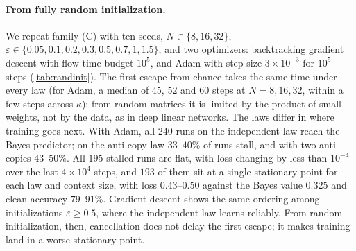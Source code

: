 \paragraph{From fully random initialization.}
We repeat family (C) with ten seeds, $N\in\{8,16,32\}$, $\varepsilon\in\{0.05,0.1,0.2,0.3,0.5,0.7,1,1.5\}$, and two optimizers: backtracking gradient descent with
flow-time budget $10^5$, and Adam with step size $3\times10^{-3}$ for $10^5$ steps (\cref{tab:randinit}).
The first escape from chance takes the same time under every law (for Adam, a median of $45$, $52$ and $60$ steps at $N=8,16,32$, within a few steps across $\kappa$):
from random matrices it is limited by the product of small weights, not by the data, as in deep linear networks.
The laws differ in where training goes next. With Adam, all $240$ runs on the independent law reach the Bayes predictor; on the anti-copy law $33$--$40\%$ of runs
stall, and with two anti-copies $43$--$50\%$. All $195$ stalled runs are flat, with loss changing by less than $10^{-4}$ over the last $4\times10^4$ steps, and $193$ of them sit at a single stationary point
for each law and context size, with loss $0.43$--$0.50$ against the Bayes value $0.325$ and clean accuracy $79$--$91\%$. Gradient descent shows the same ordering among initializations $\varepsilon\ge0.5$, where the
independent law learns reliably. From random initialization, then, cancellation does not delay the first escape; it makes training land in a worse stationary point.

\begin{table}[t]
\centering\small
\caption{\textbf{Fully random initialization, every matrix entry trained.} Anti-copy law, $\eta=0.1$, binary cross-entropy, ten seeds per initialization.
Each cell: runs reaching $99\%$ clean-rule accuracy within the budget; Adam pools eight initializations, gradient descent the four with $\varepsilon\ge0.5$.}
\label{tab:randinit}

\end{table}

\begin{table}[t]
\centering\small
\caption{\textbf{Untied one-block training under the anti-copy law.} Every matrix entry trains; binary cross-entropy, $N=16$, $\eta=0.1$.
Each cell: seeds (of three) reaching $99\%$ clean-rule accuracy within gradient-flow time $3\times10^4$, and their median time.
$\kappa=1$: independent decoys; $\kappa=0$: one anti-copy; $\kappa=-1$: two anti-copies.}
\label{tab:untied}
\fitwidth{}
\end{table}

